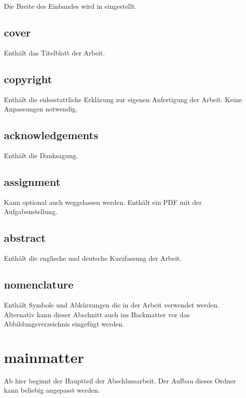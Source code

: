 Die Breite des Einbandes wird in  eingestellt.

\subsection*{cover}

Enthält das Titelblatt der Arbeit. 

\subsection*{copyright}

Enthält die eidesstattliche Erklärung zur eigenen Anfertigung der Arbeit. Keine Anpassungen notwendig.

\subsection*{acknowledgements}

Enthält die Danksagung. 

\subsection*{assignment}

Kann optional auch weggelassen werden. Enthält ein PDF mit der Aufgabenstellung.

\subsection*{abstract}

Enthält die englische und deutsche Kurzfassung der Arbeit.

\subsection*{nomenclature}

Enthält Symbole und Abkürzungen die in der Arbeit verwendet werden. Alternativ kann dieser Abschnitt auch ins Backmatter vor das Abbildungsverzeichnis eingefügt werden.

\newpage 

\section*{mainmatter}
\label{section:_A_mainmatter}

Ab hier beginnt der Hauptteil der Abschlussarbeit. Der Aufbau dieses Ordner kann beliebig angepasst werden.

